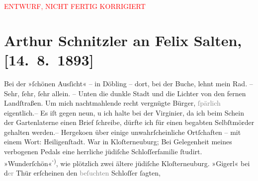 
\begin{center}
            \textcolor{red}{ENTWURF, NICHT FERTIG KORRIGIERT}
                      \end{center}
            
         
         \renewcommand{\erwaehntePersonen}{Personen: Else Berger, Oskar Blumenthal, Antonie Cuny-Pierron, Rudolf Eduard von Cuny-Pierron, Gisela Fischer, Marie Glümer, Paul Goldmann, Felix Salten}
         \renewcommand{\erwaehnteOrte}{Orte: Baden bei Wien, Brühl, Diglas’ Restaurant »Zur schönen Aussicht«, Dölsach, Heiligenstadt, Klosterneuburg, Linz, Salzburg, Wien, XIX., Döbling}
         \renewcommand{\erwaehnteWerke}{}
               \section[Arthur Schnitzler an Felix Salten, {[}14. 8. 1893{]}]{ Arthur Schnitzler an Felix Salten, {[}14. 8. 1893{]}}\nopagebreak{}\rehead{ }\begin{ledgroupsized}[t]{13cm}\normalsize\beginnumbering \toendnotes[C]{\smallbreak\pagebreak[2]} 
\toendnotes[C]{\smallbreak}\pstart
           \noindent{}{\pb}Bei der »ſchönen Ausſicht« – in Döbling – dort,
               bei der Buche, lehnt mein Rad. – Sehr, ſehr, ſehr allein. – Unten die dunkle Stadt
               und die Lichter von den fernen Landſtraßen. Um mich nachtmahlende recht vergnügte
               Bürger, \textcolor{gray}{ſpärlich} eigentlich.– Es iſt gegen neun, u ich halte bei
               der Virginier, da ich beim Schein der Gartenlaterne {\pb}einen Brief ſchreibe, dürfte ich für einen
               begabten Selbſtmörder gehalten werden.– Hergeko{\geminationm}en über
               einige unwahrſcheinliche Ortſchaften – mit einem Wort: Heiligenſtadt. War in Kloſterneuburg;
               Bei Gelegenheit meines verbogenen Pedals eine herrliche jüdiſche Schloſſerfamilie {\pb}ſtudirt. »Wunderſchön«\textsuperscript{⋅)}, wie plötzlich zwei ältere jüdiſche Kloſterneuburg. »Gigerl« bei d\textcolor{gray}{er} Thür erſcheinen {\kaufmannsund} den \textcolor{gray}{beſuchten} Schloſſer ſagten,

\end{ledgroupsized}
